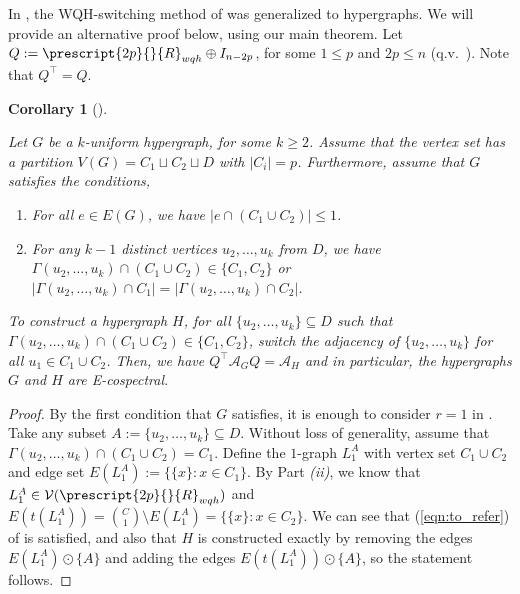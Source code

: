 \documentclass[12pt]{article}
\numberwithin{equation}{section}
\newtheorem{corollary}[theorem]{Corollary}
\theoremstyle{definition}
\newcommand{\ev}[1]{( #1 )}
\begin{document}
In \cite[Theorem 2.6, p.~4]{abiad_khramova}, the WQH-switching method of \cite{wang_qui_hu_2019} was generalized to hypergraphs. We will provide an alternative proof below, using our main theorem. Let $Q := \prescript{2p}{}{R}_{wqh} \oplus I_{n-2p}$, for some $1\leq p$ and $2p\leq n$ (q.v.~). Note that $Q^\top = Q$.
\begin{corollary}[\cite{abiad_khramova}]
\label{cor:E_WQH_switch}

Let $G$ be a $k$-uniform hypergraph, for some $k\geq 2$. Assume that the vertex set has a partition $V\ev{G} = C_1 \sqcup C_2 \sqcup D$ with $|C_i| = p $. Furthermore, assume that $G$ satisfies the conditions,
\begin{enumerate}
\item For all $e\in E\ev{G}$, we have $|e \cap (C_1 \cup C_2) |\leq 1$. 
\item For any $k-1$ distinct vertices $u_2,\ldots, u_k$ from $D$, we have $\Gamma\ev{ u_2,\ldots, u_k } \cap (C_1 \cup C_2) \in \{ C_1, C_2 \}$ or $|\Gamma\ev{ u_2,\ldots, u_k } \cap C_1| = |\Gamma\ev{ u_2,\ldots, u_k } \cap C_2|$.
\end{enumerate}
To construct a hypergraph $H$, for all $\{ u_2, \ldots, u_k \} \subseteq D$ such that $\Gamma\ev{ u_2,\ldots, u_k } \cap (C_1 \cup C_2) \in \{ C_1, C_2 \}$, switch the adjacency of $\{u_2,\ldots, u_k\}$ for all $u_1 \in C_1 \cup C_2$. Then, we have $Q^\top \mathcal{A}_G Q = \mathcal{A}_H$ and in particular, the hypergraphs $G$ and $H$ are E-cospectral. 
\end{corollary}
\begin{proof}
By the first condition that $G$ satisfies, it is enough to consider $r=1$ in . Take any subset $A := \{ u_2, \ldots, u_k \} \subseteq D$. Without loss of generality, assume that $\Gamma\ev{ u_2,\ldots, u_k } \cap (C_1 \cup C_2) = C_1 $. Define the $1$-graph $L_1^{A}$ with vertex set $C_1 \cup C_2$ and edge set $E\ev{L_1^{A}} := \{ \{ x \}: x\in C_1\}$. By  Part \textit{(ii)}, we know that $L_1^{A} \in \mathcal{V}\ev{\prescript{2p}{}{R}_{wqh}} $ and $E\ev{ t\ev{ L_1^{A} }} = \binom{C}{1} \setminus E\ev{L_1^{A}} = \{ \{ x \}: x\in C_2 \} $. We can see that (\ref{eqn:to_refer}) of  is satisfied, and also that $H$ is constructed exactly by removing the edges $E\ev{L_1^{A}} \odot \{A\}$ and adding the edges $E\ev{t\ev{ L_1^{A} }} \odot \{A\}$, so the statement follows.
\end{proof}
\end{document}
